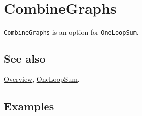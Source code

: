 \documentclass[../FeynCalcManual.tex]{subfiles}
\begin{document}
\hypertarget{combinegraphs}{
\section{CombineGraphs}\label{combinegraphs}}

\texttt{CombineGraphs} is an option for \texttt{OneLoopSum}.

\subsection{See also}

\hyperlink{toc}{Overview}, \hyperlink{oneloopsum}{OneLoopSum}.

\subsection{Examples}
\end{document}
